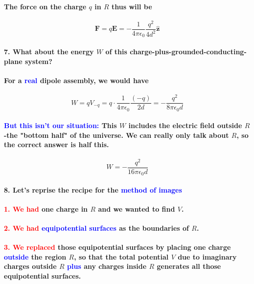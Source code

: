 \documentclass{article}
\begin{document}
\paragraph{The force on the charge $q$ in $R$ thus will be}
\begin{equation*}
    \boldsymbol{F}=q\boldsymbol{E}=-\frac{1}{4\pi\epsilon_0}\frac{q^2}{4d^2}\hat{\boldsymbol{z}}
\end{equation*}
\paragraph{7. What about the energy $W$ of this charge-plus-grounded-conducting-plane system?}
\paragraph{For a \textcolor{blue}{real} dipole assembly, we would have}
\begin{equation*}
    W=qV_{-q}=q\cdot\frac{1}{4\pi\epsilon_0}\frac{(-q)}{2d}=-\frac{q^2}{8\pi\epsilon_0d}
\end{equation*}
\paragraph{\textcolor{blue}{But this isn't our situation:} This $W$ includes the electric field outside $R$-the "bottom half" of the universe. We can really only talk about $R$, so the correct answer is half this.}
\begin{equation*}
    W=-\frac{q^2}{16\pi\epsilon_0d}
\end{equation*}
\paragraph{8. Let's reprise the recipe for the \textcolor{blue}{method of images}}
\paragraph{\indent \textcolor{red}{1. We had} one charge in $R$ and we wanted to find $V$.}
\paragraph{\indent \textcolor{red}{2. We had} \textcolor{blue}{equipotential surfaces} as the boundaries of $R$.}
\paragraph{\indent \textcolor{red}{3. We replaced} those equipotential surfaces by placing one charge \textcolor{blue}{outside} the region $R$, so that the total potential $V$ due to imaginary charges outside $R$ \textcolor{blue}{plus} any charges inside $R$ generates all those equipotential surfaces.}
\end{document}
